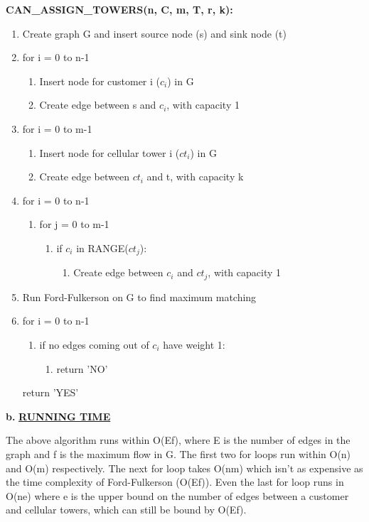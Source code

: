 \documentclass[11pt]{csc_assignment}
\begin{document}
\begin{description}
\textbf{CAN\_ASSIGN\_TOWERS(n, C, m, T, r, k):}
\begin{enumerate}[leftmargin=5pt]
	\item[] Create graph G and insert source node (s) and sink node (t)
	\item[] for i = 0 to n-1
	\begin{enumerate}
		\item[] Insert node for customer i ($c_i$) in G
		\item[] Create edge between s and $c_i$, with capacity 1
	\end{enumerate}
	\item[] for i = 0 to m-1
	\begin{enumerate}
		\item[] Insert node for cellular tower i ($ct_i$) in G
		\item[] Create edge between $ct_i$ and t, with capacity k
	\end{enumerate}
	\item[] for i = 0 to n-1
	\begin{enumerate}
		\item[] for j = 0 to m-1
		\begin{enumerate}
			\item[] if $c_i$ in RANGE($ct_j$):
			\begin{enumerate}
				\item[] Create edge between $c_i$ and $ct_j$, with capacity 1
			\end{enumerate}
		\end{enumerate}
	\end{enumerate}
	\item[] Run Ford-Fulkerson on G to find maximum matching
	\item[] for i = 0 to n-1
	\begin{enumerate}
		\item[] if no edges coming out of $c_i$ have weight 1:
		\begin{enumerate}
			\item[] return 'NO'
		\end{enumerate}
	\end{enumerate}
	return 'YES'
\end{enumerate}

\textbf{b.} \underline{\textbf{RUNNING TIME}}

The above algorithm runs within O(Ef), where E is the number of edges in the graph and f is the maximum flow in G. The first two for loops run within O(n) and O(m) respectively. The next for loop takes O(nm) which isn't as expensive as the time complexity of Ford-Fulkerson (O(Ef)). Even the last for loop runs in O(ne) where e is the upper bound on the number of edges between a customer and cellular towers, which can still be bound by O(Ef). \\


\end{description}
\end{document}
